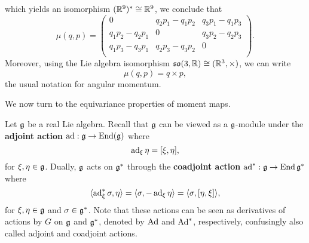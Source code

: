 \documentclass{amsart}
\begin{document}
\begin{example}
    which yields an isomorphism $(\mathbb{R}^9)^*\cong\mathbb{R}^9$, we conclude that
    \begin{equation*}
        \mu(q,p) =
        \begin{pmatrix}
            0 & q_2p_1-q_1p_2 & q_3p_1-q_1p_3 \\
            q_1p_2-q_2p_1 & 0 & q_3p_2-q_2p_3 \\
            q_1p_3-q_3p_1 & q_2p_3-q_3p_2 & 0\\
        \end{pmatrix}.
    \end{equation*}
    Moreover, using the Lie algebra isomorphism $\mathfrak{so}(3,\mathbb{R})\cong (\mathbb{R}^3,\times)$, we can write
    \begin{equation*}
        \mu(q,p) = q \times p,
    \end{equation*}
    the usual notation for angular momentum.
\end{example}

\begin{example}
    
\end{example}

We now turn to the equivariance properties of moment maps.

\begin{definition}
    Let $\mathfrak g$ be a real Lie algebra. Recall that $\mathfrak g$ can be viewed as a $\mathfrak g$-module
    under the \textbf{adjoint action} $\operatorname{ad}:\mathfrak g\to \operatorname{End}(\mathfrak g)$ where
    \begin{equation*}
        \operatorname{ad}_\xi\eta = [\xi,\eta],
    \end{equation*}
    for $\xi,\eta\in\mathfrak g$. Dually, $\mathfrak g$ acts on $\mathfrak g^*$ through the \textbf{coadjoint action}
    $\operatorname{ad}^*:\mathfrak g\to\operatorname{End}\mathfrak g^*$ where
    \begin{equation*}
        \langle\operatorname{ad}_\xi^*\sigma,\eta\rangle = \langle \sigma, -\operatorname{ad}_\xi\eta\rangle = \langle \sigma, [\eta,\xi]\rangle,
    \end{equation*}
    for $\xi,\eta\in\mathfrak g$ and $\sigma\in\mathfrak g^*$.
    Note that these actions can be seen as derivatives of actions by $G$ on $\mathfrak g$ and $\mathfrak g^*$,
    denoted by $\operatorname{Ad}$ and $\operatorname{Ad}^*$, respectively, confusingly also called adjoint and coadjoint actions.
\end{definition}
\end{document}
